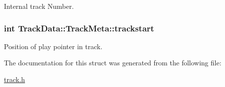 Internal track Number. 

\hypertarget{structTrackData_1_1TrackMeta_aed3a7875e7d4443b153d62fddb4517ab}{
\subsubsection[{trackstart}]{\setlength{\rightskip}{0pt plus 5cm}int Track\-Data\-::\-Track\-Meta\-::trackstart}}\label{structTrackData_1_1TrackMeta_aed3a7875e7d4443b153d62fddb4517ab}


Position of play pointer in track. 



The documentation for this struct was generated from the following file\-:\begin{DoxyCompactItemize}
\item 
\hyperlink{track_8h}{track.\-h}\end{DoxyCompactItemize}
